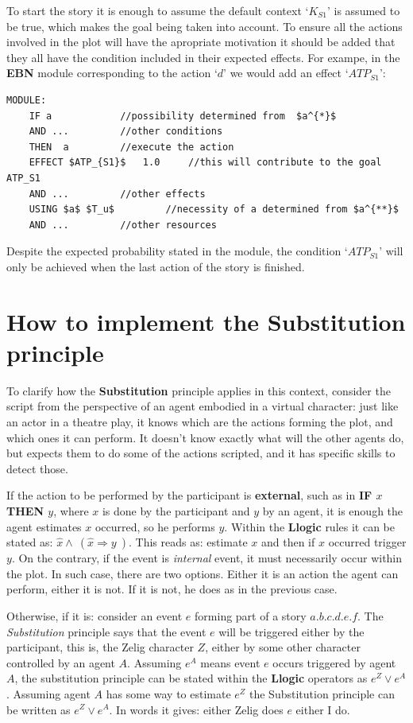 \documentclass[
		twoside,openright,titlepage,numbers=noenddot,manychapters,
		headinclude,%
                footinclude=false,cleardoublepage=empty,
                BCOR=5mm,
		fontsize=11pt, %
                 enabledeprecatedfontcommands]{scrreprt}
\begin{document}
To start the story it is enough to assume the default context `$K_{S1}$'  is assumed to be true, which makes the goal being taken into account. To ensure all the actions involved in the plot will have the apropriate motivation it should be added that they all have the condition included in their expected effects. For exampe, in the \textbf{EBN} module corresponding to the action `$d$' we would add an effect `$ATP_{S1}$':
\begin{lstlisting}[mathescape]
MODULE:
	IF a 			//possibility determined from  $a^{*}$
	AND ...			//other conditions
	THEN  a			//execute the action
	EFFECT $ATP_{S1}$	1.0		//this will contribute to the goal ATP_S1
	AND ...			//other effects
	USING $a$ $T_u$			//necessity of a determined from $a^{**}$
	AND ...			//other resources
\end{lstlisting}





Despite the expected probability stated in the module, the condition `$ATP_{S1}$' will only be achieved when the last action of the story is finished.


\section{How to implement the Substitution principle}

To clarify how the \textbf{Substitution} principle applies in this context,
consider the script from the perspective of an agent embodied in a virtual character: just like an actor in a theatre play, it knows which are the actions forming the plot, and which ones it can perform. It doesn't know exactly what will the other agents do, but expects them to do some of the actions scripted, and it has specific skills to detect those.

If the action to be performed by the participant is \textbf{external}, such as in \textbf{IF $x$ THEN $y$}, where $x$ is done by the participant and $y$ by an agent, it is enough the agent estimates $x$ occurred, so he performs $y$. Within the \textbf{Llogic} rules it can be stated as: $\hat{x} \wedge \ ( \hat{x} \Rightarrow y \ )$. This reads as: estimate $x$ and then if $x$ occurred trigger $y$.  On the contrary, if the event is \emph{internal} event, it must necessarily occur within the plot. In such case, there are two options. Either it is an action the agent can perform, either it is not. If it is not, he does as in the previous case. 


Otherwise, if it is: consider an event $e$ forming part of a story $a.b.c.d.e.f$. The \emph{Substitution} principle says that the event $e$ will be triggered either by the participant, this is, the Zelig character $Z$, either by some other character controlled by an agent $A$. Assuming $e^{A}$ means event $e$ occurs triggered by agent $A$, the substitution principle can be stated within the \textbf{Llogic} operators as $ e^{Z} \vee e^{A}$. Assuming agent $A$ has some way to estimate $e^Z$  the Substitution principle can be written as %
$e^Z \vee  e^{A} $. In words it gives: either Zelig does $e$ either I do. 
\end{document}
